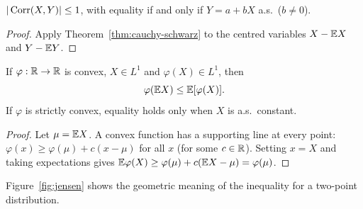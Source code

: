 \documentclass[main.tex]{subfiles}
\begin{document}
\begin{corollary}\label{cor:korelasyon}
$|\operatorname{Corr}(X,Y)|\le1$, with equality if and only if $Y=a+bX$ a.s.\ ($b\ne0$).
\end{corollary}
\begin{proof}
Apply Theorem~\ref{thm:cauchy-schwarz} to the centred variables $X-\mathbb{E} X$ and $Y-\mathbb{E} Y$.
\end{proof}

\begin{theorem}\label{thm:jensen}
If $\varphi:\mathbb{R}\to\mathbb{R}$ is convex, $X\in L^1$ and $\varphi(X)\in L^1$, then
\[
\varphi(\mathbb{E} X)\le\mathbb{E}[\varphi(X)].
\]
If $\varphi$ is strictly convex, equality holds only when $X$ is a.s.\ constant.
\end{theorem}
\begin{proof}
Let $\mu=\mathbb{E} X$. A convex function has a supporting line at every point: $\varphi(x)\ge\varphi(\mu)+c(x-\mu)$ for all $x$ (for some $c\in\mathbb{R}$). Setting $x=X$ and taking expectations gives $\mathbb{E}\varphi(X)\ge\varphi(\mu)+c(\mathbb{E} X-\mu)=\varphi(\mu)$.
\end{proof}

Figure~\ref{fig:jensen} shows the geometric meaning of the inequality for a two-point distribution.
\end{document}
